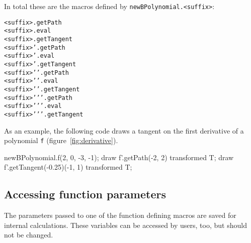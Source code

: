\documentclass{article}
\newcommand*{\cmd}[1]{\texttt{#1}}
\begin{document}
In total these are the macros defined by \cmd{newBPolynomial.<suffix>}:
\begin{center}
  \begin{minipage}{.77\textwidth}
  \begin{multicols}{2}
    \cmd{<suffix>.getPath} \\
    \cmd{<suffix>.eval} \\
    \cmd{<suffix>.getTangent} \\
    \cmd{<suffix>'.getPath} \\
    \cmd{<suffix>'.eval} \\
    \cmd{<suffix>'.getTangent} \\
    \cmd{<suffix>'{}'.getPath} \\
    \cmd{<suffix>'{}'.eval} \\
    \cmd{<suffix>'{}'.getTangent} \\
    \cmd{<suffix>'{}'{}'.getPath} \\
    \cmd{<suffix>'{}'{}'.eval} \\
    \cmd{<suffix>'{}'{}'.getTangent}
  \end{multicols}
\end{minipage}
\end{center}

As an example, the following code draws a tangent on the first derivative of a polynomial \cmd{f} (figure~\ref{fig:derivative}).

\begin{listing}
  newBPolynomial.f(2, 0, -3, -1);
  draw f'.getPath(-2, 2) transformed T;
  draw f'.getTangent(-0.25)(-1, 1) transformed T;
\end{listing}


\subsection{Accessing function parameters}\label{sec:parameters}
The parameters passed to one of the function defining macros are saved for internal calculations.  These variables can be accessed by users, too, but should not be changed.
\end{document}
